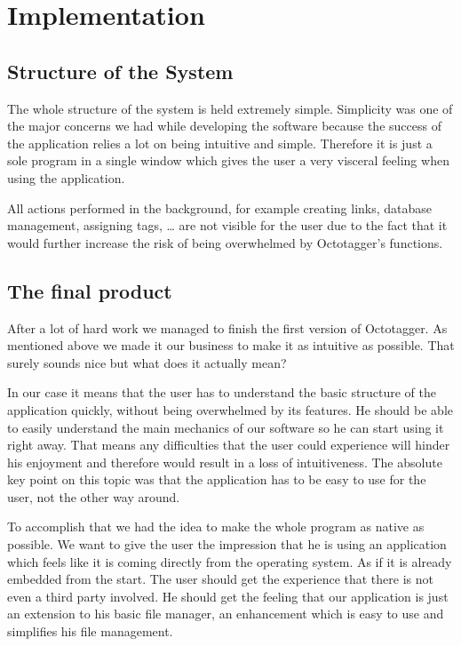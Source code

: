 \section{Implementation}
\def\kapitelautor{Christoph Führer}

\subsection{Structure of the System}
The whole structure of the system is held extremely simple. Simplicity was one of the major concerns we had while developing the software because the success of the application relies a lot on being intuitive and simple. Therefore it is just a sole program in a single window which gives the user a very visceral feeling when using the application.

All actions performed in the background, for example creating links, database management, assigning tags, \ldots{} are not visible for the user due to the fact that it would further increase the risk of being overwhelmed by Octotagger's functions.

\subsection{The final product}
After a lot of hard work we managed to finish the first version of Octotagger. As mentioned above we made it our business to make it as intuitive as possible. That surely sounds nice but what does it actually mean?

In our case it means that the user has to understand the basic structure of the application quickly, without being overwhelmed by its features. He should be able to easily understand the main mechanics of our software so he can start using it right away. That means any difficulties that the user could experience will hinder his enjoyment and therefore would result in a loss of intuitiveness. The absolute key point on this topic was that the application has to be easy to use for the user, not the other way around.

To accomplish that we had the idea to make the whole program as native as possible. We want to give the user the impression that he is using an application which feels like it is coming directly from the operating system. As if it is already embedded from the start. The user should get the experience that there is not even a third party involved. He should get the feeling that our application is just an extension to his basic file manager, an enhancement which is easy to use and simplifies his file management.

